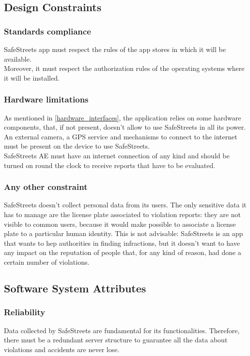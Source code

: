 \documentclass{article}
\begin{document}
		\subsection{Design Constraints}
		
			\subsubsection{Standards compliance}
				SafeStreets app must respect the rules of the app stores in which it will be available.\\
				Moreover, it must respect the authorization rules of the operating systems where it will be installed.\\
				
			\subsubsection{Hardware limitations}
				As mentioned in \ref{hardware_interfaces}, the application relies on some hardware components, that, if not present, doesn't allow to use SafeStreets in all its power. An external camera, a GPS service and mechanisms to connect to the internet must be present on the device to use SafeStreets.\\
				SafeStreets AE must have an internet connection of any kind and should be turned on round the clock to receive reports that have to be evaluated.
			
			\subsubsection{Any other constraint}
				SafeStreets doesn't collect personal data from its users. The only sensitive data it has to manage are the license plate associated to violation reports: they are not visible to common users, because it would make possible to associate a license plate to a particular human identity. This is not advisable: SafeStreets is an app that wants to hep authorities in finding infractions, but it doesn't want to have any impact on the reputation of people that, for any kind of reason, had done a certain number of violations.
		\subsection{Software System Attributes}
		
			\subsubsection{Reliability}
			Data collected by SafeStreets are fundamental for its functionalities. Therefore, there must be a redundant server structure to guarantee all the data about violations and accidents are never lose.
			
\end{document}

